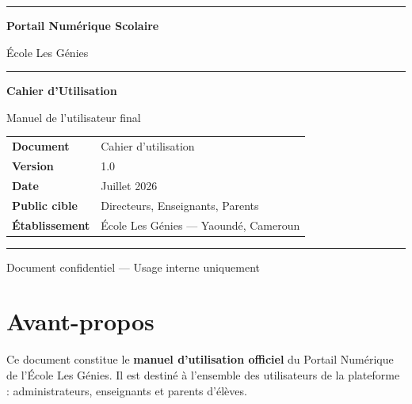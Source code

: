 \documentclass[12pt,a4paper]{report}
\begin{document}
\begin{titlepage}
  \centering
  \vspace*{2cm}

  {\color{primary}\rule{\linewidth}{3pt}}
  \vspace{0.5cm}

  {\Huge\bfseries\color{primary} Portail Numérique Scolaire \par}
  \vspace{0.4cm}
  {\LARGE\color{gray} École Les Génies \par}
  \vspace{0.8cm}

  {\color{primary}\rule{\linewidth}{1.5pt}}
  \vspace{1cm}

  {\huge\bfseries Cahier d'Utilisation \par}
  \vspace{0.5cm}
  {\large Manuel de l'utilisateur final \par}

  \vspace{2cm}

  \begin{tabular}{ll}
    \toprule
    \textbf{Document} & Cahier d'utilisation \\
    \textbf{Version}  & 1.0 \\
    \textbf{Date}     & Juillet 2026 \\
    \textbf{Public cible} & Directeurs, Enseignants, Parents \\
    \textbf{Établissement} & École Les Génies — Yaoundé, Cameroun \\
    \bottomrule
  \end{tabular}

  \vfill

  {\color{primary}\rule{\linewidth}{3pt}}
  {\small\color{gray} Document confidentiel — Usage interne uniquement}
\end{titlepage}

\tableofcontents
\clearpage

\chapter*{Avant-propos}

Ce document constitue le \textbf{manuel d'utilisation officiel} du Portail Numérique de l'École Les Génies. Il est destiné à l'ensemble des utilisateurs de la plateforme : administrateurs, enseignants et parents d'élèves.
\end{document}
